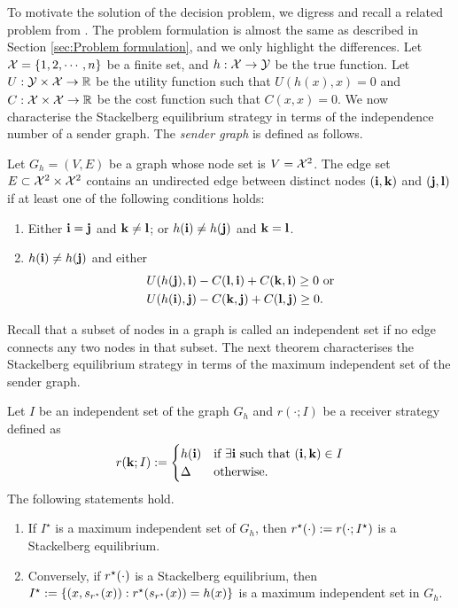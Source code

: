 To motivate the solution of the decision problem, we digress and recall a related problem from \cite{singh22strategic}. The problem formulation is almost the same as described in Section \ref{sec:Problem formulation}, and we only highlight the differences.
Let $\mathcal{X} = \{1,2,\cdots,n\}$ be a finite set, and $h:\mathcal{X} \rightarrow \mathcal{Y}$ be the true function.
Let $U: \mathcal{Y} \times \mathcal{X} \rightarrow \mathbb{R}$ be the utility function such that $U(h(x),x) = 0$ and $C: \mathcal{X} \times \mathcal{X} \rightarrow \mathbb{R}$ be the cost function such that $C(x,x) = 0$. We now characterise the Stackelberg equilibrium strategy in terms of the independence number of a sender graph.  The \textit{sender graph} is defined as follows.
\begin{defn}\label{def:Sender's graph}
	Let $G_h = (V,E)$ be a graph whose node set is $V = \mathcal{X}^2$. The edge set $E \subset \mathcal{X}^2 \times \mathcal{X}^2$ contains an undirected edge between distinct nodes $(\mathbf{i},\mathbf{k})$ and $(\mathbf{j},\mathbf{l})$ if at least one of the following conditions holds:
	\begin{enumerate}[label=(\alph*)]
		\item Either $\mathbf{i} = \mathbf{j}$ and $\mathbf{k} \neq \mathbf{l}$; or $h(\mathbf{i}) \neq h(\mathbf{j})$ and $\mathbf{k} = \mathbf{l}$.
		\item $h(\mathbf{i}) \neq h(\mathbf{j})$ and either
		\begin{equation*}
			\begin{aligned}
				&U(h(\mathbf{j}),\mathbf{i}) - C(\mathbf{l},\mathbf{i}) + C(\mathbf{k},\mathbf{i}) \geq 0 \text{ or}\\
				&U(h(\mathbf{i}),\mathbf{j}) - C(\mathbf{k},\mathbf{j}) + C(\mathbf{l},\mathbf{j}) \geq 0.
			\end{aligned}
		\end{equation*}
	\end{enumerate}
\end{defn}
Recall that a subset of nodes in a graph is called an independent set if no edge connects any two nodes in that subset. The next theorem characterises the Stackelberg equilibrium strategy in terms of the maximum independent set of the sender graph.
\begin{thm}\label{thm:Stackelberg equilibrium for discrete feature space}
	Let $I$ be an independent set of the graph $G_h$ and $r(\cdot;I)$ be a receiver strategy defined as
	\begin{equation*}
		r(\mathbf{k};I) := \begin{cases}
			h(\mathbf{i}) & \text{if } \exists \mathbf{i} \text{ such that } (\mathbf{i},\mathbf{k}) \in I\\
			\Delta & \text{otherwise}.
		\end{cases}
	\end{equation*}
	The following statements hold.
	\begin{enumerate}[label=(\alph*)]
		\item If $I^{\star}$ is a maximum independent set of $G_h$, then $r^{\star}(\cdot) := r(\cdot;I^{\star})$ is a Stackelberg equilibrium.	
		\item Conversely, if $r^{\star}(\cdot)$ is a Stackelberg equilibrium, then $I^{\star} := \{(x,s_{r^{\star}}(x)): r^{\star}(s_{r^{\star}}(x)) = h(x)\}$ is a maximum independent set in $G_h$. 
	\end{enumerate}
\end{thm}

